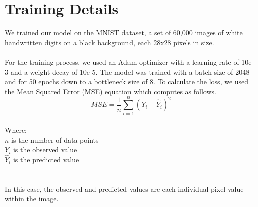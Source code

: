 \documentclass[letterpaper,11pt,twoside]{article}
\begin{document}
\section{Training Details}
We trained our model on the MNIST dataset, a set of 60,000 images of white handwritten digits on a black background, each 28x28 pixels in size. 
\\
\\
For the training process, we used an Adam optimizer with a learning rate of 10e-3 and a weight decay of 10e-5. The model was trained with a batch size of 2048 and for 50 epochs down to a bottleneck size of 8. To calculate the loss, we used the Mean Squared Error (MSE) equation which computes as follows.
\begin{equation}
  MSE = \frac{1}{n} \sum_{i=1}^{n}(Y_i - \hat{Y}_i)^2
\end{equation}
\\
Where: \\
$n$ \>\> is the number of data points \\
$Y_i$ \> is the observed value\\
$\hat{Y}_i$ \> is the predicted value \\
\\
\\
In this case, the observed and predicted values are each individual pixel value within the image.
\end{document}
